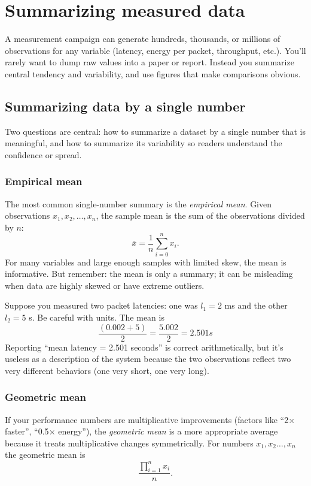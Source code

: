 \section{Summarizing measured data}
A measurement campaign can generate hundreds, thousands, or millions of observations for any variable (latency, energy per packet, throughput, etc.). You’ll rarely want to dump raw values into a paper or report. Instead you summarize central tendency and variability, and use figures that make comparisons obvious.

\subsection{Summarizing data by a single number}
Two questions are central: how to summarize a dataset by a single number that is meaningful, and how to summarize its variability so readers understand the confidence or spread.

\subsubsection{Empirical mean}
The most common single-number summary is the \textit{empirical mean}. Given observations $x_1,x_2,\ldots,x_n$, the sample mean is the sum of the observations divided by $n$:
\begin{equation*}
    \bar{x}=\frac{1}{n}\sum_{i=0}^nx_i.
\end{equation*}
For many variables and large enough samples with limited skew, the mean is informative. But remember: the mean is only a summary; it can be misleading when data are highly skewed or have extreme outliers.

Suppose you measured two packet latencies: one was $l_1=2$ ms and the other $l_2=5$ s. Be careful with units. The mean is 
\begin{equation*}
    \frac{(0.002+5)}{2}=\frac{5.002}{2}=2.501 s
\end{equation*}
Reporting “mean latency = 2.501 seconds” is correct arithmetically, but it’s useless as a description of the system because the two observations reflect two very different behaviors (one very short, one very long).

\subsubsection{Geometric mean}
If your performance numbers are multiplicative improvements (factors like “2$\times$ faster”, “0.5$\times$ energy”), the \textit{geometric mean} is a more appropriate average because it treats multiplicative changes symmetrically. For numbers $x_1,x_2\ldots,x_n$ the geometric mean is
\begin{equation*}
    \frac{\prod_{i=1}^nx_i}{n}.    
\end{equation*}

